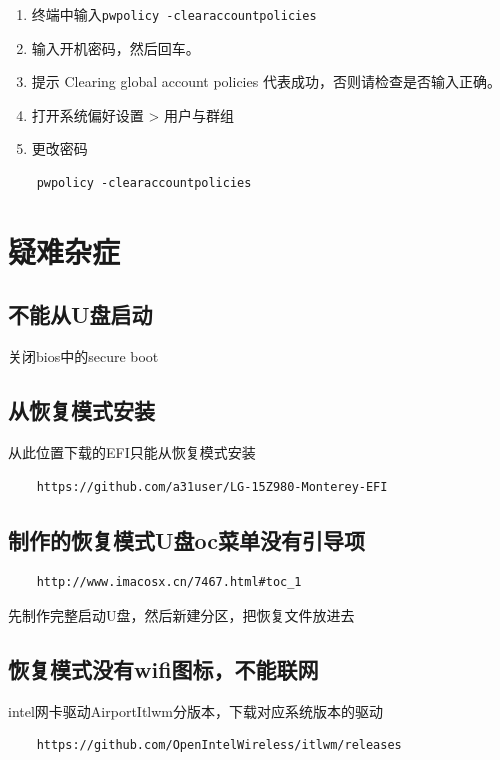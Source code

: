 \documentclass[lang=cn,12pt,chinesefont=founder]{elegantbook}
\begin{document}
\begin{enumerate}
  \item 终端中输入\verb|pwpolicy -clearaccountpolicies|
  \item 输入开机密码，然后回车。
  \item 提示 Clearing global account policies 代表成功，否则请检查是否输入正确。
  \item 打开系统偏好设置 > 用户与群组
  \item 更改密码
\end{enumerate}



\begin{lstlisting}
    pwpolicy -clearaccountpolicies
\end{lstlisting}

\section{疑难杂症}
\subsection{不能从U盘启动}
    关闭bios中的secure boot
\subsection{从恢复模式安装}
从此位置下载的EFI只能从恢复模式安装

\begin{lstlisting}
    https://github.com/a31user/LG-15Z980-Monterey-EFI
\end{lstlisting}

\subsection{制作的恢复模式U盘oc菜单没有引导项}

\begin{lstlisting}
    http://www.imacosx.cn/7467.html#toc_1
\end{lstlisting}

先制作完整启动U盘，然后新建分区，把恢复文件放进去

\subsection{恢复模式没有wifi图标，不能联网}

intel网卡驱动AirportItlwm分版本，下载对应系统版本的驱动

\begin{lstlisting}
    https://github.com/OpenIntelWireless/itlwm/releases
\end{lstlisting}
\end{document}
